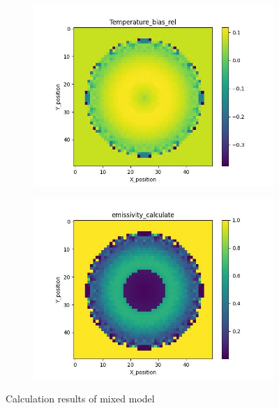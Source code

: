 \begin{figure}[htbp]
\begin{minipage}{\textwidth}
\begin{subfigure}{0.49\textwidth}
        \end{subfigure}
    \end{minipage}\\
    \begin{minipage}{\textwidth}
        \centering
        \begin{subfigure}{0.49\textwidth}
            \centering
            \includegraphics[width=\textwidth]{figures/raw_data/31/mix/T_bias.jpg}
        \end{subfigure}
        \begin{subfigure}{0.49\textwidth}
            \centering
            \includegraphics[width=\textwidth]{figures/raw_data/31/mix/emi_cal.jpg}
        \end{subfigure}
    \end{minipage}
    \caption{Calculation results of mixed model}
    \label{fig: result_mixed_model}
\end{figure}

